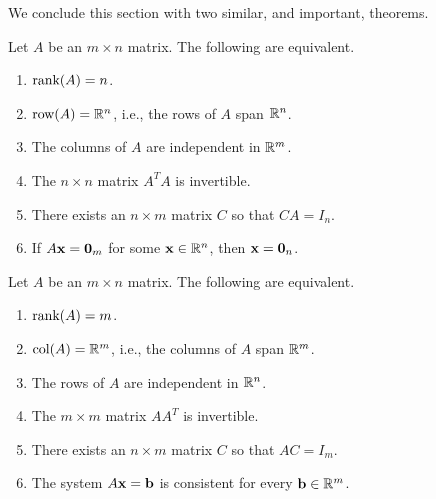 We conclude this section with two similar, and important, theorems.

\begin{theorem}{}{}
Let $A$ be an $m\times n$ matrix.
The following are equivalent.
\begin{enumerate}
\item $\mbox{rank}(A)=n$.
\item $\mbox{row}(A)=\mathbb{R}^n$, i.e., the rows of $A$ span $\mathbb{R}^n$.
\item The columns of $A$ are independent in $\mathbb{R}^m$.
\item The $n\times n$ matrix $A^TA$ is invertible.
\item There exists an $n\times m$ matrix $C$ so that $CA=I_n$.
\item If $A{\bf x}={\bf 0}_m$ for some ${\bf x}\in\mathbb{R}^n$,
then ${\bf x}={\bf 0}_n$.
\end{enumerate}
\end{theorem}

\begin{theorem}{}{}
Let $A$ be an $m\times n$ matrix.
The following are equivalent.
\begin{enumerate}
\item $\mbox{rank}(A)=m$.
\item $\mbox{col}(A)=\mathbb{R}^m$, i.e., the columns of $A$ span $\mathbb{R}^m$.
\item The rows of $A$ are independent in $\mathbb{R}^n$.
\item The $m\times m$ matrix $AA^T$ is invertible.
\item There exists an $n\times m$ matrix $C$ so that $AC=I_m$.
\item The system $A{\bf x}={\bf b}$ is consistent for
every ${\bf b}\in\mathbb{R}^m$.
\end{enumerate}
\end{theorem}

